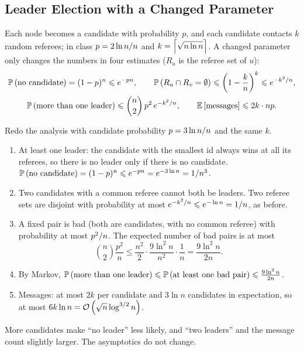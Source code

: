 \subsection{Leader Election with a Changed Parameter}

Each node becomes a candidate with probability $p$, and each candidate contacts $k$ random
referees; in class $p = 2 \ln n/n$ and $k = \left\lceil\sqrt{n \ln n}\right\rceil$. A changed parameter
only changes the numbers in four estimates ($R_u$ is the referee set of $u$):
\begin{gather*}
    \operatorname{\mathbb{P}}\left(\text{no candidate}\right) = (1-p)^n \leqslant e^{-pn},
    \qquad
    \operatorname{\mathbb{P}}\left(R_u \cap R_v = \emptyset\right) \leqslant \left(1 - \frac{k}{n}\right)^{k} \leqslant e^{-k^2/n}, \\
    \operatorname{\mathbb{P}}\left(\text{more than one leader}\right) \leqslant \binom{n}{2}\, p^2\, e^{-k^2/n},
    \qquad
    \operatorname{\mathbb{E}}\left[\text{messages}\right] \leqslant 2k \cdot np.
\end{gather*}

\begin{exercisebox}
\begin{pproblem}[$p = 3 \ln n / n$]\label{pp:leader3}
    Redo the analysis with candidate probability $p = 3 \ln n/n$ and the same $k$.
\end{pproblem}
\tcblower
\begin{wsolution}
    \leavevmode
    \begin{enumerate}
        \item At least one leader: the candidate with the smallest id always wins at all its
              referees, so there is no leader only if there is no candidate.
              $\operatorname{\mathbb{P}}\left(\text{no candidate}\right) = (1-p)^n \leqslant e^{-pn} = e^{-3 \ln n} = 1/n^3$.
        \item Two candidates with a common referee cannot both be leaders. Two referee sets are
              disjoint with probability at most $e^{-k^2/n} \leqslant e^{-\ln n} = 1/n$, as
              before.
        \item A fixed pair is bad (both are candidates, with no common referee) with probability at
              most $p^2/n$. The expected number of bad pairs is at most
              \[\binom{n}{2} \frac{p^2}{n} \leq \frac{n^2}{2} \cdot \frac{9 \ln^2 n}{n^2} \cdot \frac{1}{n} = \frac{9 \ln^2 n}{2n}.\]
        \item By Markov,
              $\operatorname{\mathbb{P}}\left(\text{more than one leader}\right) \leqslant \operatorname{\mathbb{P}}\left(\text{at least one bad pair}\right) \leqslant \frac{9 \ln^2 n}{2n}$.
        \item Messages: at most $2k$ per candidate and $3 \ln n$ candidates in expectation, so at
              most $6k \ln n = \mathcal{O}\left(\sqrt{n} \log^{3/2} n\right)$.
    \end{enumerate}
    More candidates make ``no leader'' less likely, and ``two leaders'' and the message count
    slightly larger. The asymptotics do not change.
\end{wsolution}
\end{exercisebox}

